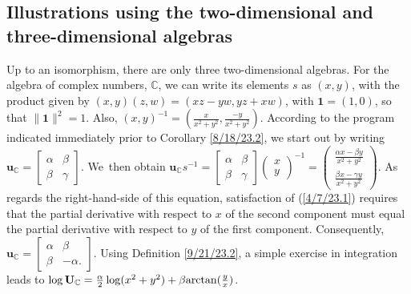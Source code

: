 \documentclass{amsart}
\numberwithin{equation}{section}
\theoremstyle{definition}
\numberwithin{theorem}{section}
\begin{document}
\subsection{Illustrations using the two-dimensional and three-dimensional algebras}
Up to an isomorphism, there are only three two-dimensional algebras.
For the algebra of complex numbers, $\mathbb{C}$, we can write its elements $s$ as $(x,y)$, with the product given by $(x,y)(z,w) = (xz-yw, yz+xw)$, with $\mathbf{1}=(1,0)$, so that $\|\mathbf{1}\|^2=1$.  Also, $(x,y)^{-1} = (\frac{x}{x^2+y^2},\frac{-y}{x^2+y^2})$.  According to the program indicated immediately prior to Corollary \ref{8/18/23.2}, we start out by writing  $\mathbf{u}_\mathbb{C} = \left[\begin{array}{ccc}
 \alpha & \beta   \\ 
 \beta & \gamma    
\end{array}\right]$.  \mbox{We then} obtain  $\mathbf{u}_\mathbb{C}s^{-1} = \left[\begin{array}{ccc}
 \alpha & \beta   \\ 
 \beta & \gamma    
\end{array}\right]\left(\begin{array}{ccc}
x   \\ 
y   
\end{array}\right)^{-1} = \left(\begin{array}{ccc}
\frac{\alpha x - \beta y}{x^2+y^2}  \\ 
\frac{\beta x - \gamma y}{x^2+y^2} 
\end{array}\right)$.  As regards the right-hand-side of this equation, satisfaction of (\ref{4/7/23.1}) requires that the partial derivative with respect to $x$ of the second component must equal the partial derivative with respect to $y$ of the first component.  Consequently, $\mathbf{u}_{\mathbb{C}} = \left[\begin{array}{ccc}
 \alpha & \beta   \\ 
 \beta & -\alpha.    
\end{array}\right]$.  Using Definition \ref{9/21/23.2}, a simple exercise in integration leads to $\log  \mathbf{U}_{\mathbb{C}} = \frac{\alpha}{2}\log(x^2+y^2) + \beta{\rm arctan}(\frac{y}{x})$.
\end{document}
